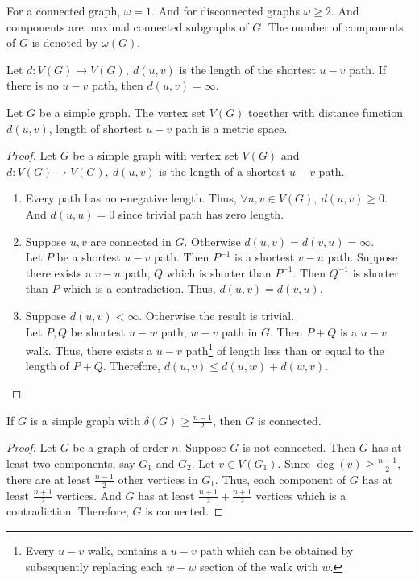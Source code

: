 \begin{remark}
	For a connected graph, $\omega = 1$. And for disconnected graphs $\omega \ge 2$. And components are maximal connected subgraphs of $G$. The number of components of $G$ is denoted by $\omega(G)$.
\end{remark}

\begin{definition}
	Let $d : V(G) \to V(G),\ d(u,v)$ is the length of the shortest $u-v$ path. If there is no $u-v$ path, then $d(u,v) = \infty$.
\end{definition}
\begin{exercise}
	Let $G$ be a simple graph.
	The vertex set $V(G)$ together with distance function $d(u,v)$, length of shortest $u-v$ path is a metric space.
\end{exercise}
\begin{proof}
	Let $G$ be a simple graph with vertex set $V(G)$ and $d : V(G) \to V(G),\ d(u,v)$ is the length of a shortest $u-v$ path.
\begin{enumerate}
	\item Every path has non-negative length. Thus, $\forall u,v \in V(G),\ d(u,v) \ge 0$.\\
	And $d(u,u) = 0$ since trivial path has zero length.
	\item Suppose $u,v$ are connected in $G$. Otherwise $d(u,v) = d(v,u) = \infty$.\\
	Let $P$ be a shortest $u-v$ path. Then $P^{-1}$ is a shortest $v-u$ path.
	Suppose there exists a $v-u$ path, $Q$ which is shorter than $P^{-1}$. Then $Q^{-1}$ is shorter than $P$ which is a contradiction.
	Thus, $d(u,v) = d(v,u)$.
	\item Suppose $d(u,v) < \infty$. Otherwise the result is trivial.\\
	Let $P,Q$ be shortest $u-w$ path, $w-v$ path in $G$. Then $P+Q$ is a $u-v$ walk.
	Thus, there exists a $u-v$ path\footnote{Every $u-v$ walk, contains a $u-v$ path which can be obtained by subsequently replacing each $w-w$ section of the walk with $w$.} of length less than or equal to the length of $P+Q$.
	Therefore, $d(u,v) \le d(u,w) + d(w,v)$.
\end{enumerate}
\end{proof}

\begin{proposition}
	If $G$ is a simple graph with $\delta(G) \ge \frac{n-1}{2}$, then $G$ is connected.
\end{proposition}
\begin{proof}
	Let $G$ be a graph of order $n$.
	Suppose $G$ is not connected. Then $G$ has at least two components, say $G_1$ and $G_2$.
	Let $v \in V(G_1)$. Since $\deg(v) \ge \frac{n-1}{2}$, there are at least $\frac{n-1}{2}$ other vertices in $G_1$.
	Thus, each component of $G$ has at least $\frac{n+1}{2}$ vertices.
	And $G$ has at least $\frac{n+1}{2} + \frac{n+1}{2}$ vertices which is a contradiction.
	Therefore, $G$ is connected.
\end{proof}

